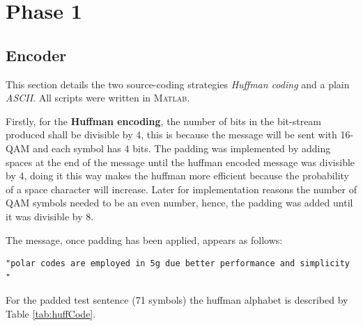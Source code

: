 \section{Phase 1}

\subsection{Encoder}

\label{sec:encoder}

This section details the two source-coding strategies \emph{Huffman coding} and a plain \emph{ASCII}. All scripts were written in \textsc{Matlab}.

\label{ssec:huffman}

Firstly, for the \textbf{Huffman encoding}, the number of bits in the bit-stream produced shall be divisible by 4, this is because the message will be sent with 16-QAM and each symbol has 4 bits. The padding was implemented by adding spaces at the end of the message until the huffman encoded message was divisible by 4, doing it this way makes the huffman more efficient because the probability of a space character will increase. Later for implementation reasons the number of QAM symbols needed to be an even number, hence, the padding was added until it was divisible by 8. 

The message, once padding has been applied, appears as follows:

\begin{center}
	\begin{verbatim}
"polar codes are employed in 5g due better performance and simplicity     "
	\end{verbatim}
	
\end{center}

For the padded test sentence (71 symbols) the huffman alphabet is described by Table \ref{tab:huffCode}.

